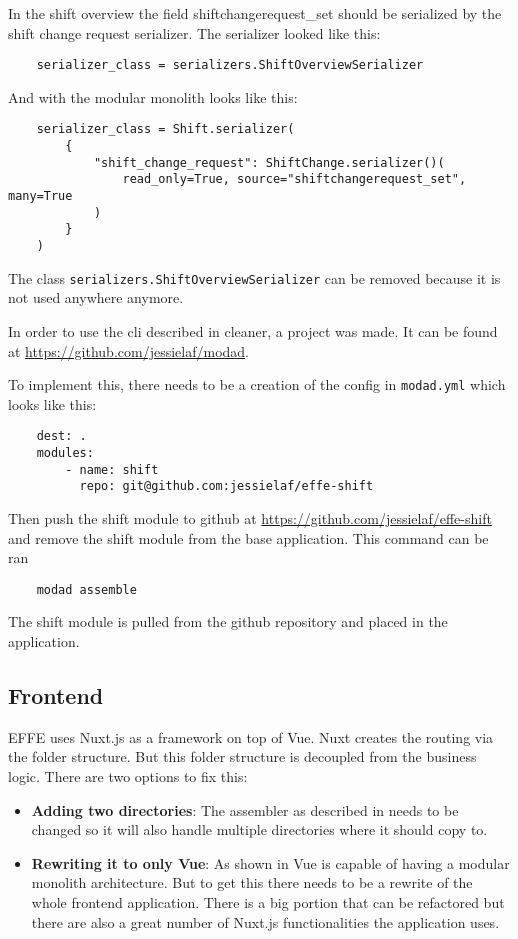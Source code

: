 In the shift overview the field shiftchangerequest\_set should be serialized by the shift change request serializer. The serializer looked like this:
\begin{verbatim}
    serializer_class = serializers.ShiftOverviewSerializer
\end{verbatim}

And with the modular monolith looks like this:
\begin{verbatim}
    serializer_class = Shift.serializer(
        {
            "shift_change_request": ShiftChange.serializer()(
                read_only=True, source="shiftchangerequest_set", many=True
            )
        }
    )
\end{verbatim}

The class \texttt{serializers.ShiftOverviewSerializer} can be removed because it is not used anywhere anymore.

In order to use the cli described in  cleaner, a project was made. It can be found at \url{https://github.com/jessielaf/modad}.

To implement this, there needs to be a creation of the config in \texttt{modad.yml} which looks like this:
\begin{verbatim}
    dest: .
    modules:
        - name: shift
          repo: git@github.com:jessielaf/effe-shift
\end{verbatim}

Then push the shift module to github at \url{https://github.com/jessielaf/effe-shift} and remove the shift module from the base application. This command can be ran
\begin{verbatim}
    modad assemble
\end{verbatim}

The shift module is pulled from the github repository and placed in the application.

\subsection{Frontend}

EFFE uses Nuxt.js as a framework on top of Vue. Nuxt creates the routing via the folder structure. But this folder structure is decoupled from the business logic. There are two options to fix this:

\begin{itemize}
    \item \textbf{Adding two directories}: The assembler as described in  needs to be changed so it will also handle multiple directories where it should copy to.
    \item \textbf{Rewriting it to only Vue}: As shown in  Vue is capable of having a modular monolith architecture. But to get this there needs to be a rewrite of the whole frontend application. There is a big portion that can be refactored but there are also a great number of Nuxt.js functionalities the application uses.
\end{itemize}

